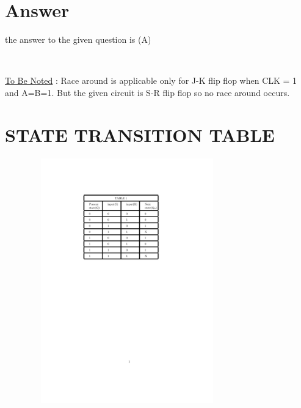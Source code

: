 \documentclass{article}
\begin{document}
\maketitle
\section{Answer}

the answer to the given question is (A)

\\
\begin{center}
\underline{To Be Noted} : Race around is applicable only for J-K flip flop when CLK = 1 and A=B=1. But the given circuit is S-R flip flop so no race around occurs.
\end{center}                         

\maketitle
\section{STATE TRANSITION TABLE}

\begin{center}
\includegraphics[width=400,height=400]{STATE_TRANSITION_TABLE.pdf}
\end{center}
\end{document}
